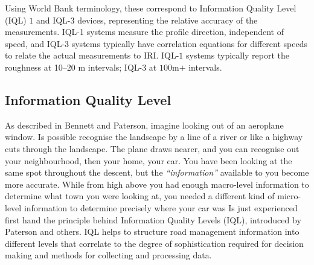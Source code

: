 \documentclass[tesi]{subfiles}
\begin{document}
Using World Bank terminology, these correspond to Information Quality Level (IQL) $1$ and IQL-$3$ devices, representing the relative accuracy of the measurements\cite{bennett2006data}. IQL-1 systems measure the profile direction, independent of speed, and IQL-3 systems typically have correlation equations for different speeds to relate the actual measurements to IRI.
IQL-$1$ systems typically report the roughness at \numrange{10}{20} \si{\meter} intervals; IQL-3 at $100$\si{\meter}$+$ intervals.

\subsection{Information Quality Level}\label{ssc:Information Quality Level}
As described in Bennett and Paterson\cite{bennett2000guide}, imagine looking out of an aeroplane window. Is possible recognise the landscape by a line of a river or like a highway cuts through the landscape. The plane draws nearer, and you can recognise out your neighbourhood, then your home, your car. You have been looking at the same spot throughout the descent, but the \textit{“information”} available to you become more accurate. While from high above you had enough macro-level information to determine what town you were looking at, you needed a different kind of micro-level information to determine precisely where your car was
Is just experienced first hand the principle behind Information Quality Levels (IQL), introduced by Paterson and others\cite{paterson2}. IQL helps to structure road management information into different levels that correlate to the degree of sophistication required for decision making and methods for collecting and processing data.
\end{document}

